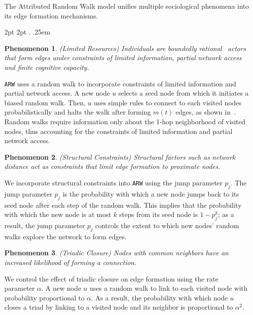 The Attributed Random Walk model unifies multiple sociological phenomena
into its edge formation mechanisms.

  {2pt} %
  {2pt} %
  {\itshape} %
  {} %
  {\bfseries} %
  {.} %
  {.25em} %
  {} %

\theoremstyle{exampstyle} \newtheorem{ph}{Phenomenon}

\begin{ph}
	(Limited Resources) Individuals are boundedly rational~\cite{simon1972theories,gigerenzer1996reasoning,lipman1995information}
	actors that form edges under constraints of limited information, partial network access and finite cognitive capacity.
\end{ph}
\texttt{ARW} uses a random walk to incorporate constraints of limited information
and partial network access. A new node $u$ selects a seed node from which it
initiates a biased random walk. Then, $u$ uses simple rules to connect to each visited
nodes probabilistically and halts the walk after forming $m(t)$ edges, as shown in~. Random walks require information only about the
1-hop neighborhood of visited nodes, thus accounting for  the constraints of limited information and partial network access.

\begin{ph}
	(Structural Constraints) Structural factors such as network distance
	act as constraints that limit edge formation to proximate nodes.  \cite{35626}
\end{ph}

We incorporate structural constraints into \texttt{ARW} using the jump parameter $p_j$.
The jump parameter $p_j$ is the probability with which a new node jumps back to its seed node
after each step of the random walk. This implies that the probability with which the new node
is at most $k$ steps from its seed node is $1-p^k_j$; as a result, the jump parameter $p_j$
controls the extent to which new nodes' random walks explore the network to form edges.

\begin{ph}
	(Triadic Closure) Nodes with common neighbors have an
	increased likelihood of forming a connection. \cite{simmel1950sociology}
\end{ph}

We control the effect of triadic closure on edge formation using the
rate parameter $\alpha$. A new node $u$ uses a random walk to
link to each visited node with probability proportional to $\alpha$. As a
result, the probability with which node $u$ closes a triad by linking to
a visited node and its neighbor is proportional to $\alpha^2$.

